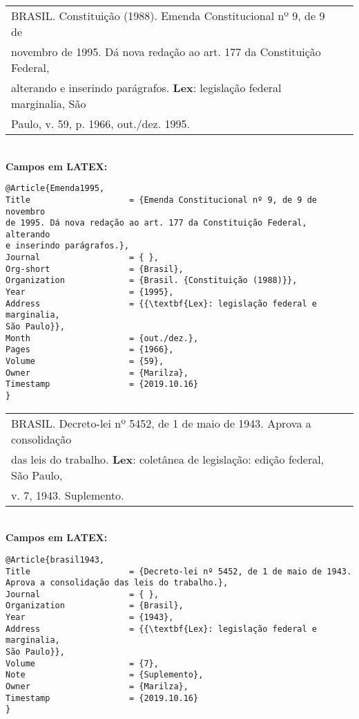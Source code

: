\begin{tabular}{|l|c|} \hline
	BRASIL. Constituição (1988). Emenda Constitucional 
	nº 9, de 9 de \\novembro de 1995. Dá nova redação ao art. 177 da Constituição
	Federal,\\ alterando e inserindo parágrafos. \textbf{Lex}: legislação federal marginalia, São \\ Paulo, v. 59, p. 1966, out./dez. 1995.  
	\\\hline
\end{tabular} \\

\textbf{Campos em LATEX:} \\

\begin{verbatim}
@Article{Emenda1995,
Title                    = {Emenda Constitucional nº 9, de 9 de novembro 
de 1995. Dá nova redação ao art. 177 da Constituição Federal, alterando 
e inserindo parágrafos.},
Journal                  = { },
Org-short                = {Brasil},
Organization             = {Brasil. {Constituição (1988)}},
Year                     = {1995},
Address                  = {{\textbf{Lex}: legislação federal e marginalia, 
São Paulo}},
Month                    = {out./dez.},
Pages                    = {1966},
Volume                   = {59},
Owner                    = {Marilza},
Timestamp                = {2019.10.16}
}
\end{verbatim}

\begin{tabular}{|l|c|} \hline
	BRASIL. Decreto-lei nº 5452, de 1 de maio de 1943. Aprova a consolidação \\ das leis do trabalho. \textbf{Lex}: coletânea de legislação: edição federal, São Paulo, \\ v. 7, 1943. Suplemento.
	\\\hline
\end{tabular} \\

\textbf{Campos em LATEX:} 

\begin{verbatim}
@Article{brasil1943,
Title                    = {Decreto-lei nº 5452, de 1 de maio de 1943. 
Aprova a consolidação das leis do trabalho.},
Journal                  = { },
Organization             = {Brasil},
Year                     = {1943},
Address                  = {{\textbf{Lex}: legislação federal e marginalia, 
São Paulo}},
Volume                   = {7},
Note                     = {Suplemento},
Owner                    = {Marilza},
Timestamp                = {2019.10.16}
}
\end{verbatim}

